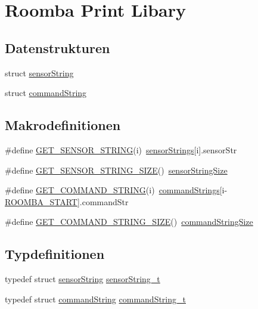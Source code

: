 \hypertarget{group__roomba__print}{\section{Roomba Print Libary}
\label{group__roomba__print}
}
\subsection*{Datenstrukturen}
\begin{DoxyCompactItemize}
\item 
struct \hyperlink{structsensorString}{sensor\-String}
\item 
struct \hyperlink{structcommandString}{command\-String}
\end{DoxyCompactItemize}
\subsection*{Makrodefinitionen}
\begin{DoxyCompactItemize}
\item 
\#define \hyperlink{group__roomba__print_ga27a9ecb5dd155d9f2bae907545a6b839}{G\-E\-T\-\_\-\-S\-E\-N\-S\-O\-R\-\_\-\-S\-T\-R\-I\-N\-G}(i)~\hyperlink{group__roomba__print_ga6c1d8b935c25685ddc669cf5732959c9}{sensor\-Strings}\mbox{[}i\mbox{]}.sensor\-Str
\item 
\#define \hyperlink{group__roomba__print_gaafe8e141e91feb307cb5e350c5f89ead}{G\-E\-T\-\_\-\-S\-E\-N\-S\-O\-R\-\_\-\-S\-T\-R\-I\-N\-G\-\_\-\-S\-I\-Z\-E}()~\hyperlink{group__roomba__print_gabad382977fd4c5e46c059079738e61a5}{sensor\-String\-Size}
\item 
\#define \hyperlink{group__roomba__print_ga029025a55e418643b565d4a190cbdebc}{G\-E\-T\-\_\-\-C\-O\-M\-M\-A\-N\-D\-\_\-\-S\-T\-R\-I\-N\-G}(i)~\hyperlink{group__roomba__print_ga09654e789137e4251796c5b93e250ff8}{command\-Strings}\mbox{[}i-\/\hyperlink{group__roomba__commands__start_gaf1978389e19799d1dbf5e66303e86042}{R\-O\-O\-M\-B\-A\-\_\-\-S\-T\-A\-R\-T}\mbox{]}.command\-Str
\item 
\#define \hyperlink{group__roomba__print_ga7514207411815f70138573592088eaf8}{G\-E\-T\-\_\-\-C\-O\-M\-M\-A\-N\-D\-\_\-\-S\-T\-R\-I\-N\-G\-\_\-\-S\-I\-Z\-E}()~\hyperlink{group__roomba__print_gaf00c5bc38c301b8cc77ea05a2c022406}{command\-String\-Size}
\end{DoxyCompactItemize}
\subsection*{Typdefinitionen}
\begin{DoxyCompactItemize}
\item 
typedef struct \hyperlink{structsensorString}{sensor\-String} \hyperlink{group__roomba__print_gaf352ce472b626ebab957aab98d88e93f}{sensor\-String\-\_\-t}
\item 
typedef struct \hyperlink{structcommandString}{command\-String} \hyperlink{group__roomba__print_ga9592eed8fec0d1b2dbe577e30b8bc959}{command\-String\-\_\-t}
\end{DoxyCompactItemize}
